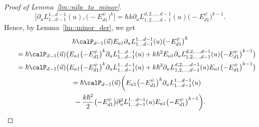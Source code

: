 \begin{proof}[Proof of Lemma~\ref{lm::nilp_to_minor}]
		\[
		\bigl[\partial_u L_{1\dots d-1}^{1\dots d-1}(u),\bigl(-E_{d1}^{\psi}\bigr)^k\bigr] = \hbar k \partial_u L_{1,2,\dots,d-1}^{d,2,\dots,d-1}(u) \bigl(-E_{d1}^{\psi}\bigr)^{k-1}.
		\]
		Hence, by Lemma~\ref{lm::minor_der}, we get
		\begin{gather}
\hbar \calP_{d-1}(\vec{u})E_{a1} \partial_u L_{1\dots d-1}^{1\dots d-1}(u) \bigl(-E_{d1}^{\psi}\bigr)^k\nonumber \\
			\qquad	=\hbar \calP_{d-1}(\vec{u}) \bigl( E_{a1} \bigl(-E_{d1}^{\psi}\bigr)^k \partial_u L_{1\dots d-1}^{1\dots d-1}(u) + k \hbar^2 E_{a1} \partial_u L_{1,2,\dots,d-1}^{d,2,\dots,d-1}(u) \bigl(-E_{d1}^{\psi}\bigr)^{k-1} \bigr)\nonumber \\
				\qquad= \hbar \calP_{d-1}(\vec{u})\bigl(E_{a1} \bigl(-E_{d1}^{\psi}\bigr)^k \partial_u L_{1\dots d-1}^{1\dots d-1}(u) + k \hbar^2 \partial_u L_{1,2,\dots,d-1}^{d,2,\dots,d-1}(u) E_{a1} \bigl(-E_{d1}^{\psi}\bigr)^{k-1} \bigr)\nonumber\\
			\qquad	= \hbar \calP_{d-1}(\vec{u})\biggl( E_{a1} \bigl(-E_{d1}^{\psi}\bigr)^k \partial_u L_{1\dots d-1}^{1\dots d-1}(u) \nonumber \\
\phantom{\qquad	=}{} - \frac{k\hbar^2}{2} \bigl(-E_{d1}^{\psi}\bigr) \partial^2_u L_{1\dots d-1}^{1\dots d-1}(u) E_{a1} \bigl(-E_{d1}^{\psi}\bigr)^{k-1}\biggr).\label{eq::derivative_past_k_power}
		\end{gather}
		

\end{proof}
